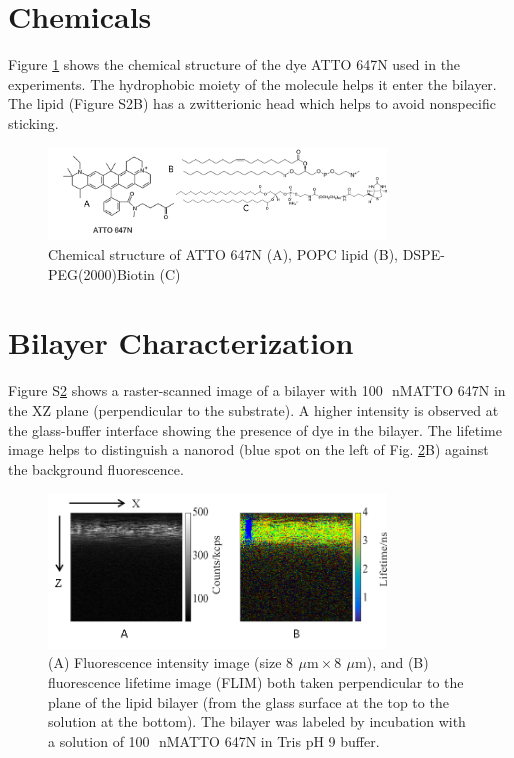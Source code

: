 \documentclass[11pt,a4paper,onecolumn]{article}
\newcommand{\um}{\ensuremath{\,\mu\textrm{m}}}
\newcommand{\nM}{\ensuremath{\,\textrm{nM}}}
\begin{document}
\section{Chemicals}
Figure \ref{SIfig:chemical} shows the chemical structure of the dye ATTO 647N used in the experiments. The
hydrophobic moiety of the molecule helps it enter the bilayer. The lipid (Figure S2B) has a
zwitterionic head which helps to avoid nonspecific sticking.
\begin{figure}[ht]
  \centering
  \includegraphics[width=0.8\textwidth]{chemical_picture.png}
  \makeatletter
  \renewcommand{\fnum@figure}{\figurename~S\thefigure}
  \makeatother{}
  \caption{Chemical structure of ATTO 647N (A), POPC lipid (B), DSPE-PEG(2000)Biotin (C)}
  \label{SIfig:chemical}
\end{figure}
\section{Bilayer Characterization}
Figure S\ref{SIfig:xz-scan} shows a raster-scanned image of a bilayer with 100~\nM ATTO 647N in the XZ plane
(perpendicular to the substrate). A higher intensity is observed at the glass-buffer interface
showing the presence of dye in the bilayer. The lifetime image helps to distinguish a nanorod
(blue spot on the left of Fig. \ref{SIfig:xz-scan}B) against the background fluorescence.
\begin{figure}[ht]
  \centering
  \includegraphics[width=0.8\textwidth]{xz_scan.png}
  \makeatletter
  \renewcommand{\fnum@figure}{\figurename~S\thefigure}
  \makeatother{}
  \caption{(A) Fluorescence intensity image (size $8~\um\times8~\um$), and (B) fluorescence lifetime image (FLIM) both taken perpendicular to the plane of the lipid bilayer (from the glass surface at the top to the solution at the bottom). The bilayer was labeled by incubation with a solution of 100~\nM ATTO 647N in Tris pH 9 buffer.}
  \label{SIfig:xz-scan}
\end{figure}
\end{document}
